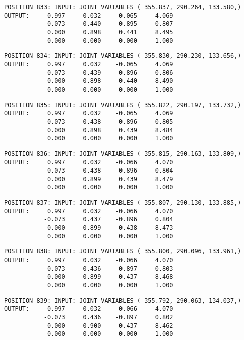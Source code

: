 \begin{verbatim}
POSITION 833: INPUT: JOINT VARIABLES ( 355.837, 290.264, 133.580,)
OUTPUT:     0.997     0.032    -0.065     4.069
           -0.073     0.440    -0.895     0.807
            0.000     0.898     0.441     8.495
            0.000     0.000     0.000     1.000
\end{verbatim} \pagebreak[1]\begin{verbatim}
POSITION 834: INPUT: JOINT VARIABLES ( 355.830, 290.230, 133.656,)
OUTPUT:     0.997     0.032    -0.065     4.069
           -0.073     0.439    -0.896     0.806
            0.000     0.898     0.440     8.490
            0.000     0.000     0.000     1.000
\end{verbatim} \pagebreak[1]\begin{verbatim}
POSITION 835: INPUT: JOINT VARIABLES ( 355.822, 290.197, 133.732,)
OUTPUT:     0.997     0.032    -0.065     4.069
           -0.073     0.438    -0.896     0.805
            0.000     0.898     0.439     8.484
            0.000     0.000     0.000     1.000
\end{verbatim} \pagebreak[1]\begin{verbatim}
POSITION 836: INPUT: JOINT VARIABLES ( 355.815, 290.163, 133.809,)
OUTPUT:     0.997     0.032    -0.066     4.070
           -0.073     0.438    -0.896     0.804
            0.000     0.899     0.439     8.479
            0.000     0.000     0.000     1.000
\end{verbatim} \pagebreak[1]\begin{verbatim}
POSITION 837: INPUT: JOINT VARIABLES ( 355.807, 290.130, 133.885,)
OUTPUT:     0.997     0.032    -0.066     4.070
           -0.073     0.437    -0.896     0.804
            0.000     0.899     0.438     8.473
            0.000     0.000     0.000     1.000
\end{verbatim} \pagebreak[1]\begin{verbatim}
POSITION 838: INPUT: JOINT VARIABLES ( 355.800, 290.096, 133.961,)
OUTPUT:     0.997     0.032    -0.066     4.070
           -0.073     0.436    -0.897     0.803
            0.000     0.899     0.437     8.468
            0.000     0.000     0.000     1.000
\end{verbatim} \pagebreak[1]\begin{verbatim}
POSITION 839: INPUT: JOINT VARIABLES ( 355.792, 290.063, 134.037,)
OUTPUT:     0.997     0.032    -0.066     4.070
           -0.073     0.436    -0.897     0.802
            0.000     0.900     0.437     8.462
            0.000     0.000     0.000     1.000
\end{verbatim} \pagebreak[1]\begin{verbatim}

\end{verbatim}
